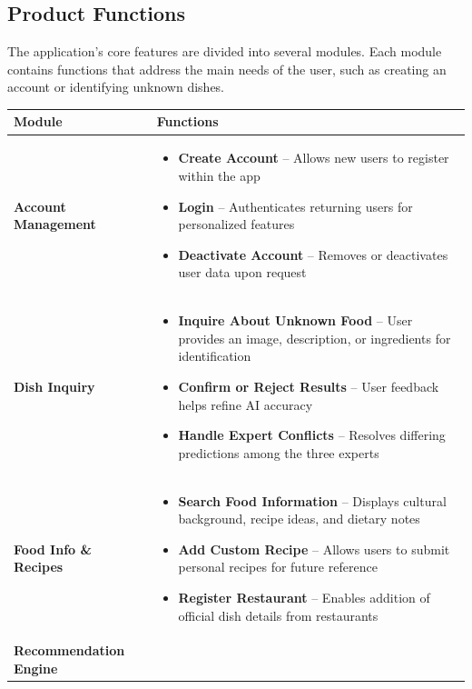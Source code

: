 \documentclass[]{article}
\begin{document}
\subsection{Product Functions}
\label{sub:product_functions}

The application's core features are divided into several modules. Each module contains functions that address the main needs of the user, such as creating an account or identifying unknown dishes.

\begin{table}[H]
\centering
\renewcommand{\arraystretch}{1.2} %
\begin{tabular}{|p{4cm}|p{10cm}|}
\hline
\textbf{Module} & \textbf{Functions} \\
\hline
\textbf{Account Management} &
\begin{itemize}
    \item \textbf{Create Account} – Allows new users to register within the app
    \item \textbf{Login} – Authenticates returning users for personalized features
    \item \textbf{Deactivate Account} – Removes or deactivates user data upon request
\end{itemize} \\
\hline
\textbf{Dish Inquiry} &
\begin{itemize}
    \item \textbf{Inquire About Unknown Food} – User provides an image, description, or ingredients for identification
    \item \textbf{Confirm or Reject Results} – User feedback helps refine AI accuracy
    \item \textbf{Handle Expert Conflicts} – Resolves differing predictions among the three experts
\end{itemize} \\
\hline
\textbf{Food Info \& Recipes} &
\begin{itemize}
    \item \textbf{Search Food Information} – Displays cultural background, recipe ideas, and dietary notes
    \item \textbf{Add Custom Recipe} – Allows users to submit personal recipes for future reference
    \item \textbf{Register Restaurant} – Enables addition of official dish details from restaurants
\end{itemize} \\
\hline
\textbf{Recommendation Engine} &

\end{tabular}
\end{table}
\end{document}
